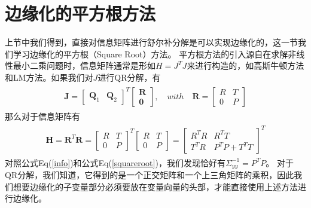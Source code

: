 \documentclass[a4pape,oneside,10pt]{article}
\begin{document}
\section{边缘化的平方根方法}
上节中我们得到，直接对信息矩阵进行舒尔补分解是可以实现边缘化的，这一节我们学习边缘化的平方根（Square Root）方法。
平方根方法的引入源自在求解非线性最小二乘问题时，信息矩阵通常是形如$H=J^TJ$来进行构造的，如高斯牛顿方法和LM方法。如果我们对$J$进行QR分解，有
\begin{equation}
    \label{qr}
    \begin{split}
    \begin{aligned}
        \textbf{J} = \begin{bmatrix}
            \textbf{Q}_1 & \textbf{Q}_2
        \end{bmatrix} ^T
        \begin{bmatrix}
            \textbf{R} \\ \textbf{0}
        \end{bmatrix},  
        \quad with \quad \textbf{R} = \begin{bmatrix}
            R & T \\
            0 & P
        \end{bmatrix}
    \end{aligned}
    \end{split}
    \end{equation}
那么对于信息矩阵有
\begin{equation}
    \label{squareroot}
    \begin{split}
    \begin{aligned}
        \textbf{H} = \textbf{R}^T\textbf{R} = 
        \begin{bmatrix}
            R & T \\
            0 & P
        \end{bmatrix} ^T
        \begin{bmatrix}
            R & T \\
            0 & P
        \end{bmatrix}
        =
        \begin{bmatrix}
            R^TR & R^TT \\
            T^TR & P^TP + T^TT
        \end{bmatrix} ^T
    \end{aligned}
    \end{split}
\end{equation}
对照公式Eq(\ref{info})和公式Eq(\ref{squareroot})，我们发现恰好有$\Sigma_{yy}^{-1} = P^TP$。
对于QR分解，我们知道，它得到的是一个正交矩阵和一个上三角矩阵的乘积，因此我们想要边缘化的子变量部分必须要放在变量向量的头部，才能直接使用上述方法进行边缘化。
\end{document}
